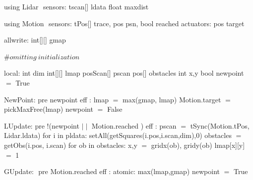 using Lidar $\label{lidardef}$
    sensors:
       tscan[] ldata 
       float maxdist

using Motion $\label{moddef}$
    sensors:
        tPos[] trace, pos psn,
        bool reached
    actuators:
       pos target

allwrite:$\label{awvar}$
    int[][] gmap 
    
#$\mathit{omitting\ initialization}$

local:
   int dim
   int[][] lmap 
   posScan[] pscan
   pos[] obstacles
   int x,y
   bool newpoint $=$ True
   
NewPoint:$\label{newpt}$
  pre newpoint
  eff : lmap $=$ max(gmap, lmap)
        Motion.target $=$ pickMaxFree(lmap)
        newpoint $=$ False

LUpdate:$\label{lup}$
   pre !(newpoint $\mid\mid$ Motion.reached )
   eff : pscan $=$ tSync(Motion.tPos, Lidar.ldata)
         for i in pldata:
            setAll(getSquares(i.pos,i.scan,dim),0)
             obstacles $=$ getObs(i.pos, i.scan)
             for ob in obstacles:
                 x,y $=$ gridx(ob), gridy(ob)
                 lmap[x][y] $=$ 1
    
GUpdate: $\label{gup}$
  pre Motion.reached
  eff : atomic:
           max(lmap,gmap)
        newpoint $=$ True
      

